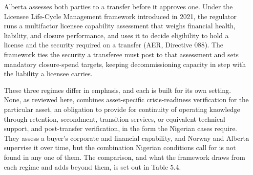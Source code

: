\documentclass[twoside,fontset=lmodern]{mitthesis}
\begin{document}
Alberta assesses both parties to a transfer before it approves one.
Under the Licensee Life-Cycle Management framework introduced in 2021,
the regulator runs a multifactor licensee capability assessment that
weighs financial health, liability, and closure performance, and uses it
to decide eligibility to hold a license and the security required on a
transfer (AER, Directive 088). The framework ties the security a
transferee must post to that assessment and sets mandatory closure-spend
targets, keeping decommissioning capacity in step with the liability a
licensee carries.

These three regimes differ in emphasis, and each is built for its own
setting. None, as reviewed here, combines asset-specific
crisis-readiness verification for the particular asset, an obligation to
provide for continuity of operating knowledge through retention,
secondment, transition services, or equivalent technical support, and
post-transfer verification, in the form the Nigerian cases require. They
assess a buyer's corporate and financial capability, and Norway and
Alberta supervise it over time, but the combination Nigerian conditions
call for is not found in any one of them. The comparison, and what the
framework draws from each regime and adds beyond them, is set out in
Table 5.4.
\end{document}
